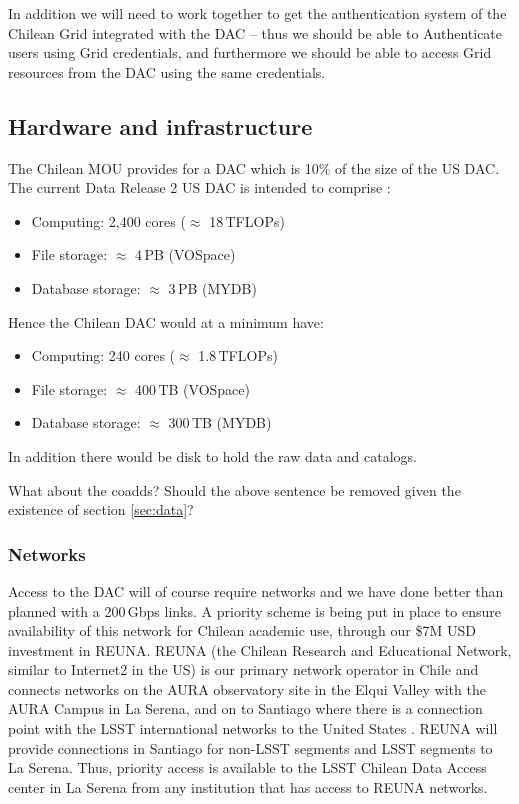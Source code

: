 In addition we will need to work together to get the authentication system of the Chilean Grid integrated with the DAC -- thus we should be able to Authenticate users using Grid credentials, and furthermore we should be able to access Grid resources from the DAC using the same credentials.


\subsection{Hardware and infrastructure}

The Chilean MOU provides for a DAC which is 10\% of the size of the US DAC.
The current Data Release 2 US DAC is intended to comprise :
\begin{itemize}
\item Computing: 2,400 cores ($\approx$ 18\,TFLOPs)
\item File storage: $\approx$ 4\,PB  (VOSpace)
\item Database storage: $\approx$ 3\,PB (MYDB)

\end{itemize}

Hence the Chilean DAC would at a minimum have:
\begin{itemize}
\item Computing: 240 cores ($\approx$ 1.8\,TFLOPs)
\item File storage: $\approx$ 400\,TB  (VOSpace)
\item Database storage: $\approx$ 300\,TB (MYDB)

\end{itemize}

In addition there would be disk to hold the raw data and catalogs.

\begin{draftnote}
What about the coadds? Should the above sentence be removed given the existence of section \ref{sec:data}?
\end{draftnote}

\subsubsection{Networks}

Access to the DAC will of course require networks and we have done better than planned with a 200\,Gbps links.
A priority scheme is being put in place to ensure availability of this network  for Chilean academic use, through our \$7M USD investment in REUNA.
REUNA (the Chilean Research and Educational Network, similar to Internet2 in the US) is our primary network operator in Chile and connects networks on the AURA observatory site in the Elqui Valley with the AURA Campus in La Serena, and on to Santiago where there is a connection point with the LSST international networks to the United States .
REUNA will provide connections in Santiago for non-LSST segments and LSST segments to La Serena.
Thus, priority access is available to the LSST Chilean Data Access center in La Serena from any institution that has access to REUNA networks.

